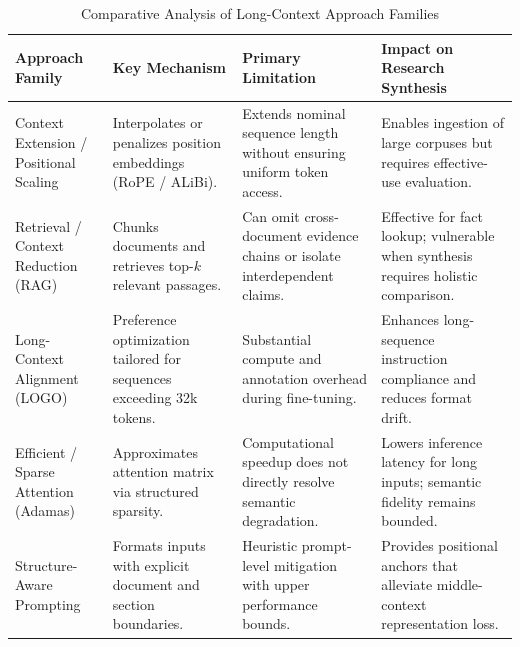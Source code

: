 \documentclass[manuscript,screen,oneside]{acmart}
\begin{document}
\begin{table}[t]
\centering
\caption{Comparative Analysis of Long-Context Approach Families}
\label{tab:comparison}
\small
\begin{tabularx}{\textwidth}{p{} X X X}
\toprule
\textbf{Approach Family} & \textbf{Key Mechanism} & \textbf{Primary Limitation} & \textbf{Impact on Research Synthesis} \\
\midrule
Context Extension / Positional Scaling & Interpolates or penalizes position embeddings (RoPE / ALiBi). & Extends nominal sequence length without ensuring uniform token access. & Enables ingestion of large corpuses but requires effective-use evaluation. \\
Retrieval / Context Reduction (RAG) & Chunks documents and retrieves top-$k$ relevant passages. & Can omit cross-document evidence chains or isolate interdependent claims. & Effective for fact lookup; vulnerable when synthesis requires holistic comparison. \\
Long-Context Alignment (LOGO) & Preference optimization tailored for sequences exceeding 32k tokens. & Substantial compute and annotation overhead during fine-tuning. & Enhances long-sequence instruction compliance and reduces format drift. \\
Efficient / Sparse Attention (Adamas) & Approximates attention matrix via structured sparsity. & Computational speedup does not directly resolve semantic degradation. & Lowers inference latency for long inputs; semantic fidelity remains bounded. \\
Structure-Aware Prompting & Formats inputs with explicit document and section boundaries. & Heuristic prompt-level mitigation with upper performance bounds. & Provides positional anchors that alleviate middle-context representation loss. \\
\bottomrule
\end{tabularx}
\end{table}
\end{document}
